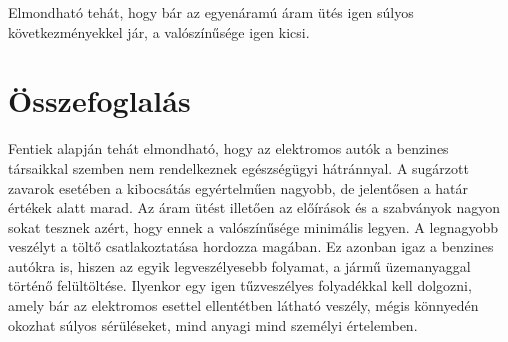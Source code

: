 Elmondható tehát, hogy bár az egyenáramú áram ütés igen súlyos következményekkel jár, a valószínűsége igen kicsi.



\section{Összefoglalás}

Fentiek alapján tehát elmondható, hogy az elektromos autók a benzines társaikkal szemben nem rendelkeznek egészségügyi hátránnyal. A sugárzott zavarok esetében a kibocsátás egyértelműen nagyobb, de jelentősen a határ értékek alatt marad. Az áram ütést illetően az előírások és a szabványok nagyon sokat tesznek azért, hogy ennek a valószínűsége minimális legyen. A legnagyobb veszélyt a töltő csatlakoztatása hordozza magában. Ez azonban igaz a benzines autókra is, hiszen az egyik legveszélyesebb folyamat, a jármű üzemanyaggal történő felültöltése. Ilyenkor egy igen tűzveszélyes folyadékkal kell dolgozni, amely bár az elektromos esettel ellentétben látható veszély, mégis könnyedén okozhat súlyos sérüléseket, mind anyagi mind személyi értelemben.









